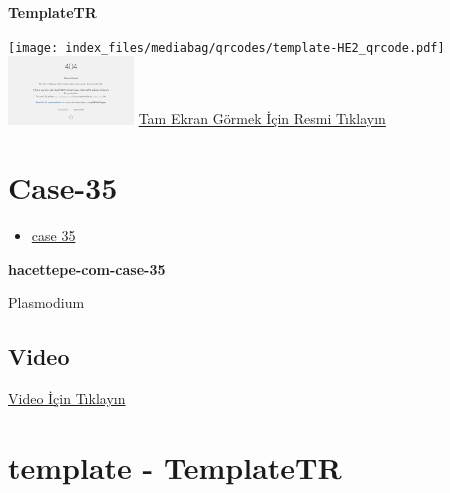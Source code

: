 \documentclass[
  letterpaper,
  DIV=11,
  numbers=noendperiod]{scrreprt}
\providecommand{\tightlist}{%
  \setlength{\itemsep}{0pt}\setlength{\parskip}{0pt}}\usepackage{longtable,booktabs,array}
\begin{document}
\textbf{TemplateTR}

\texttt{[image: index\_files/mediabag/qrcodes/template-HE2\_qrcode.pdf]}
\href{https://images.patolojiatlasi.com/template/HE2.html}{\includegraphics[width=0.25\textwidth,height=\textheight]{./screenshots/thumbnail_template-HE2.png}}
\href{https://images.patolojiatlasi.com/template/HE2.html}{Tam Ekran
Görmek İçin Resmi Tıklayın}

\hypertarget{sec-hacettepe-case-of-the-month-case-35}{%
\section{Case-35}\label{sec-hacettepe-case-of-the-month-case-35}}

\begin{itemize}
\tightlist
\item
  \href{https://www.youtube.com/watch?v=f_rdB9xqpiw&ab_channel=KemalKosemehmetoglu}{case
  35}
\end{itemize}

\textbf{hacettepe-com-case-35}

\begin{tcolorbox}[enhanced jigsaw, breakable, opacitybacktitle=0.6, arc=.35mm, colbacktitle=quarto-callout-tip-color!10!white, colback=white, toptitle=1mm, left=2mm, opacityback=0, colframe=quarto-callout-tip-color-frame, titlerule=0mm, rightrule=.15mm, bottomrule=.15mm, toprule=.15mm, bottomtitle=1mm, title=\textcolor{quarto-callout-tip-color}{\faLightbulb}\hspace{0.5em}{Tanı}, coltitle=black, leftrule=.75mm]

Plasmodium

\end{tcolorbox}

\hypertarget{video-34}{%
\subsection{Video}\label{video-34}}

\href{https://www.youtube.com/watch?v=f_rdB9xqpiw}{Video İçin Tıklayın}

\hypertarget{sec-template}{%
\section{template - TemplateTR}\label{sec-template}}
\end{document}
